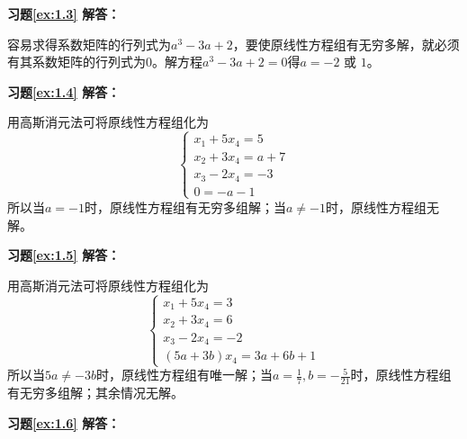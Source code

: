 \vspace{1.5em}

\textbf{习题\ref{ex:1.3} 解答：}

容易求得系数矩阵的行列式为$a^3 - 3a + 2$，要使原线性方程组有无穷多解，就必须有其系数矩阵的行列式为0。解方程$a^3 - 3a + 2 = 0$得$a = -2$ 或 $1$。

\vspace{1.5em}

\textbf{习题\ref{ex:1.4} 解答：}

用高斯消元法可将原线性方程组化为
$$\begin{cases} x_1 + 5x_4 = 5 \\ x_2 + 3x_4 = a+7 \\ x_3 - 2x_4 = -3 \\ 0 = -a-1 \end{cases}$$
所以当$a = -1$时，原线性方程组有无穷多组解；当$a\neq -1$时，原线性方程组无解。

\vspace{1.5em}

\textbf{习题\ref{ex:1.5} 解答：}

用高斯消元法可将原线性方程组化为
$$\begin{cases} x_1 + 5x_4 = 3 \\ x_2 + 3x_4 = 6 \\ x_3 - 2x_4 = -2 \\ (5 a + 3 b)x_4 = 3 a + 6 b + 1 \end{cases}$$
所以当$5a \neq -3b$时，原线性方程组有唯一解；当$a = \frac17, b = -\frac{5}{21}$时，原线性方程组有无穷多组解；其余情况无解。

\vspace{1.5em}

\textbf{习题\ref{ex:1.6} 解答：}

